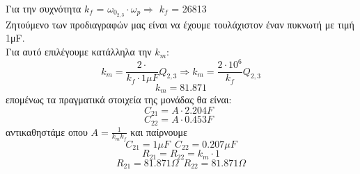 \documentclass{article}
\begin{document}
\large{}
Για την συχνότητα $k_f$ = $ω_{0_{2,3}} \cdot ω_p \Rightarrow$ $k_f$ = 26813 \\ 
Ζητούμενο των προδιαγραφών μας είναι να έχουμε τουλάχιστον έναν πυκνωτή με τιμή 1μF. \\
Για αυτό επιλέγουμε κατάλληλα την $k_m$:
\begin{equation*}
 k_m = \frac{2 \cdot }{k_f \cdot 1μF}Q_{2,3} \Rightarrow k_m = \frac{2 \cdot 10^6}{k_f}Q_{2,3}
\end{equation*}
\begin{equation*}
k_m = 81.871 
\end{equation*}
επομένως τα πραγματικά στοιχεία της μονάδας θα είναι:
\begin{equation*}
C_{21}= A \cdot 2.204 F \enspace  
\end{equation*}
\begin{equation*}
C_{22}= A \cdot 0.453 F \enspace  
\end{equation*}
αντικαθηστάμε οπου $Α = \frac{1}{k_m k_f}$ και παίρνουμε
\begin{equation*}
\boxed{C_{21}=1μF} \enspace \boxed{C_{22}=0.207μF}
\end{equation*}
\begin{equation*}
R_{21}= R_{22} = k_m \cdot 1
\end{equation*}
\begin{equation*}
\boxed{R_{21}= 81.871  Ω} \enspace \boxed{R_{22}= 81.871  Ω}
\end{equation*}
\end{document}
